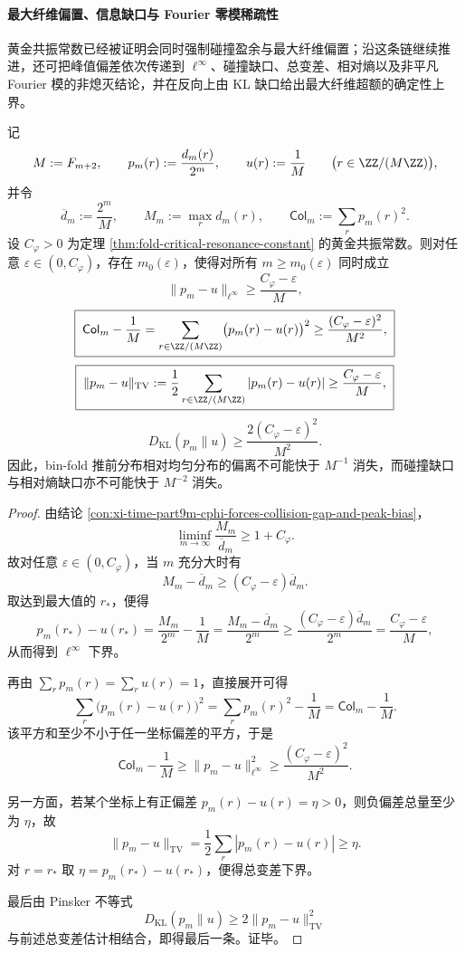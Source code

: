 \paragraph{最大纤维偏置、信息缺口与 Fourier 零模稀疏性}
黄金共振常数已经被证明会同时强制碰撞盈余与最大纤维偏置；沿这条链继续推进，还可把峰值偏差依次传递到 \(\ell^\infty\)、碰撞缺口、总变差、相对熵以及非平凡 Fourier 模的非熄灭结论，并在反向上由 KL 缺口给出最大纤维超额的确定性上界。

\begin{theorem}[最大纤维偏置给出的统一非均匀性下界链]\label{thm:xi-time-part9m-maxfiber-uniformity-gap-chain}
记
\[
M:=F_{m+2},
\qquad
p_m(r):=\frac{d_m(r)}{2^m},
\qquad
u(r):=\frac{1}{M}
\qquad
\bigl(r\in \ZZ/(M\ZZ)\bigr),
\]
并令
\[
\overline d_m:=\frac{2^m}{M},
\qquad
M_m:=\max_r d_m(r),
\qquad
\mathsf{Col}_m:=\sum_{r}p_m(r)^2.
\]
设 \(C_\varphi>0\) 为定理 \ref{thm:fold-critical-resonance-constant} 的黄金共振常数。则对任意 \(\varepsilon\in(0,C_\varphi)\)，存在 \(m_0(\varepsilon)\)，使得对所有 \(m\ge m_0(\varepsilon)\) 同时成立
\[
\boxed{\;
\|p_m-u\|_{\ell^\infty}\ge \frac{C_\varphi-\varepsilon}{M},\;}
\]
\[
\boxed{\;
\mathsf{Col}_m-\frac{1}{M}
=
\sum_{r\in \ZZ/(M\ZZ)}\bigl(p_m(r)-u(r)\bigr)^2
\ge
\frac{(C_\varphi-\varepsilon)^2}{M^2},\;}
\]
\[
\boxed{\;
\|p_m-u\|_{\mathrm{TV}}
:=
\frac12\sum_{r\in \ZZ/(M\ZZ)}|p_m(r)-u(r)|
\ge
\frac{C_\varphi-\varepsilon}{M},\;}
\]
\[
\boxed{\;
D_{\mathrm{KL}}(p_m\|u)\ge \frac{2(C_\varphi-\varepsilon)^2}{M^2}.\;}
\]
因此，bin-fold 推前分布相对均匀分布的偏离不可能快于 \(M^{-1}\) 消失，而碰撞缺口与相对熵缺口亦不可能快于 \(M^{-2}\) 消失。
\end{theorem}
\begin{proof}
由结论 \ref{con:xi-time-part9m-cphi-forces-collision-gap-and-peak-bias}，
\[
\liminf_{m\to\infty}\frac{M_m}{\overline d_m}\ge 1+C_\varphi.
\]
故对任意 \(\varepsilon\in(0,C_\varphi)\)，当 \(m\) 充分大时有
\[
M_m-\overline d_m\ge (C_\varphi-\varepsilon)\overline d_m.
\]
取达到最大值的 \(r_\ast\)，便得
\[
p_m(r_\ast)-u(r_\ast)
=
\frac{M_m}{2^m}-\frac{1}{M}
=
\frac{M_m-\overline d_m}{2^m}
\ge
\frac{(C_\varphi-\varepsilon)\overline d_m}{2^m}
=
\frac{C_\varphi-\varepsilon}{M},
\]
从而得到 \(\ell^\infty\) 下界。

再由 \(\sum_r p_m(r)=\sum_r u(r)=1\)，直接展开可得
\[
\sum_r\bigl(p_m(r)-u(r)\bigr)^2
=
\sum_r p_m(r)^2-\frac{1}{M}
=
\mathsf{Col}_m-\frac{1}{M}.
\]
该平方和至少不小于任一坐标偏差的平方，于是
\[
\mathsf{Col}_m-\frac{1}{M}
\ge
\|p_m-u\|_{\ell^\infty}^2
\ge
\frac{(C_\varphi-\varepsilon)^2}{M^2}.
\]

另一方面，若某个坐标上有正偏差 \(p_m(r)-u(r)=\eta>0\)，则负偏差总量至少为 \(\eta\)，故
\[
\|p_m-u\|_{\mathrm{TV}}
=
\frac12\sum_r|p_m(r)-u(r)|
\ge \eta.
\]
对 \(r=r_\ast\) 取 \(\eta=p_m(r_\ast)-u(r_\ast)\)，便得总变差下界。

最后由 Pinsker 不等式
\[
D_{\mathrm{KL}}(p_m\|u)\ge 2\|p_m-u\|_{\mathrm{TV}}^2
\]
与前述总变差估计相结合，即得最后一条。证毕。
\end{proof}

